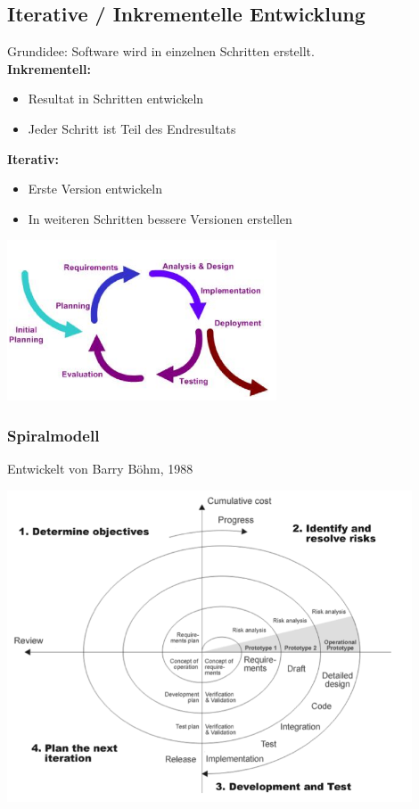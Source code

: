 \subsection{Iterative / Inkrementelle Entwicklung}
\begin{minipage}{11cm}
	Grundidee: Software wird in einzelnen Schritten erstellt. \\
	
	\textbf{Inkrementell:}
		\begin{itemize}
			\item Resultat in Schritten entwickeln
			\item Jeder Schritt ist Teil des Endresultats
		\end{itemize}
	\textbf{Iterativ:}
		\begin{itemize}					
			\item Erste Version entwickeln
			\item In weiteren Schritten bessere Versionen erstellen
		\end{itemize}
\end{minipage}
\begin{minipage}{8cm}
	\includegraphics[width=8cm]{images/iterative_entwicklung.png}
\end{minipage}

\newpage %
\subsubsection{Spiralmodell}
Entwickelt von Barry Böhm, 1988
\begin{center}
	\includegraphics[width=12cm]{images/spiral_modell.png}
\end{center}

